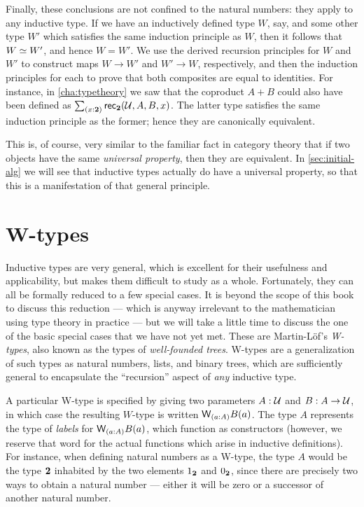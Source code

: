 Finally, these conclusions are not confined to the natural numbers: they apply to any inductive type.
If we have an inductively defined type $W$, say, and some other type $W'$ which satisfies the same induction principle as $W$, then it follows that $W \simeq W'$, and hence $W=W'$.
We use the derived recursion principles for $W$ and $W'$ to construct maps $W\to W'$ and $W'\to W$, respectively, and then the induction principles for each to prove that both composites are equal to identities.
For instance, in \autoref{cha:typetheory} we saw that the coproduct $A+B$ could also have been defined as $\sm{x:\bool} \rec{\bool}(\UU,A,B,x)$.
The latter type satisfies the same induction principle as the former; hence they are canonically equivalent.

This is, of course, very similar to the familiar fact in category theory that if two objects have the same \emph{universal property}, then they are equivalent.
In \autoref{sec:initial-alg} we will see that inductive types actually do have a universal property, so that this is a manifestation of that general principle.


\section{W-types}
\label{sec:w-types}

Inductive types are very general, which is excellent for their usefulness and applicability, but makes them difficult to study as a whole.
Fortunately, they can all be formally reduced to a few special cases.
It is beyond the scope of this book to discuss this reduction --- which is anyway irrelevant to the mathematician using type theory in practice --- but we will take a little time to discuss the one of the basic special cases that we have not yet met.
These are Martin-L{\"o}f's \emph{W-types}, also known as the types of \emph{well-founded trees}.
%
W-types are a generalization of such types as natural numbers, lists, and binary trees, which are sufficiently general to encapsulate the ``recursion'' aspect of \emph{any} inductive type.

A particular W-type is specified by giving two parameters $A : \mathcal{U}$ and $B : A \to \mathcal{U}$, in which case the resulting $W$-type is written $\wtype{a:A} B(a)$.
The type $A$ represents the type of \emph{labels} for $\wtype{a :A} B(a)$, which function as constructors (however, we reserve that word for the actual functions which arise in inductive definitions). For instance, when defining natural numbers as a W-type,%
the type $A$ would be the type $\mathbf{2}$ inhabited by the two elements ${1_{\mathbf{2}}}$ and ${0_{\mathbf{2}}}$, since there are precisely two ways to obtain a natural number --- either it will be zero or a successor of another natural number. 

